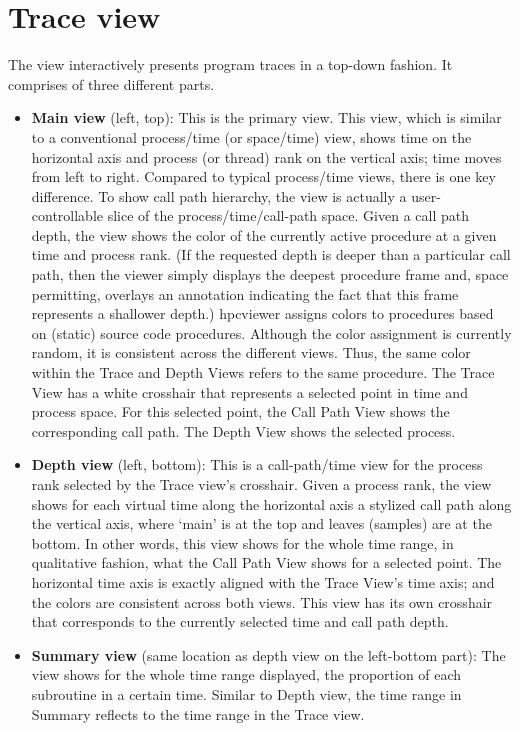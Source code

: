 \documentclass[english]{article}
\begin{document}
\section{Trace view}

The view interactively presents program traces in a top-down fashion.
It comprises of three different parts.


\begin{itemize}
\item \textbf{Main view} (left, top):
  This is the primary view.
  This view, which is similar to a conventional process/time (or space/time) view, shows time on the horizontal axis and process (or thread) rank on the vertical axis; time moves from left to right.
  Compared to typical process/time views, there is one key difference.
  To show call path hierarchy, the view is actually a user-controllable slice of the process/time/call-path space.
  Given a call path depth, the view shows the color of the currently active procedure at a given time and process rank.
  (If the requested depth is deeper than a particular call path, then the viewer simply displays the deepest procedure frame and, space permitting, overlays an annotation indicating the fact that this frame represents a shallower depth.)
  hpcviewer assigns colors to procedures based on (static) source code procedures.
  Although the color assignment is currently random, it is consistent across the different views.
  Thus, the same color within the Trace and Depth Views refers to the same procedure.
  The Trace View has a white crosshair that represents a selected point in time and process space.
  For this selected point, the Call Path View shows the corresponding call path.
  The Depth View shows the selected process.

\item \textbf{Depth view} (left, bottom):
  This is a call-path/time view for the process rank selected by the Trace view's crosshair.
  Given a process rank, the view shows for each virtual time along the horizontal axis a stylized call path along the vertical axis, where `main' is at the top and leaves (samples) are at the bottom.
  In other words, this view shows for the whole time range, in qualitative fashion, what the Call Path View shows for a selected point.
  The horizontal time axis is exactly aligned with the Trace View's time axis; and the colors are consistent across both views.
  This view has its own crosshair that corresponds to the currently selected time and call path depth.

\item \textbf{Summary view} (same location as depth view on the left-bottom part):
  The view shows for the whole time range displayed, the proportion of each subroutine in a certain time.
  Similar to Depth view, the time range in Summary reflects to the time range in the Trace view.


\end{itemize}
\end{document}
